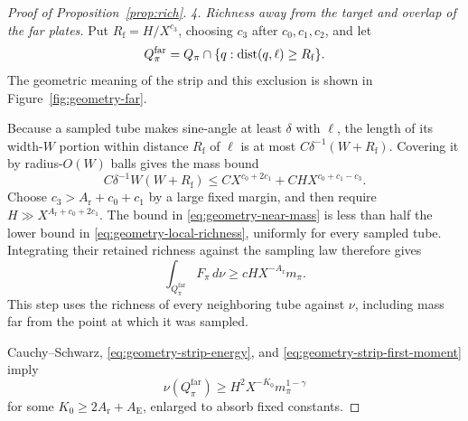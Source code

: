 \begin{proof}[Proof of Proposition~\ref{prop:rich}]
\emph{4. Richness away from the target and overlap of the far plates.}
Put $R_{\mathrm f}=H/X^{c_3}$, choosing $c_3$ after $c_0,c_1,c_2$,
and let
\[
 Q_\pi^{\mathrm{far}}
   =Q_\pi\cap\{q:\operatorname{dist}(q,\ell)\geq R_{\mathrm f}\}.
\]
The geometric meaning of the strip and this exclusion is shown in
Figure~\ref{fig:geometry-far}.

Because a sampled tube makes sine-angle at least $\delta$ with
$\ell$, the length of its width-$W$ portion within distance
$R_{\mathrm f}$ of $\ell$ is at most
$C\delta^{-1}(W+R_{\mathrm f})$. Covering it by radius-$O(W)$
balls gives the mass bound
\begin{equation}\label{eq:geometry-near-mass}
 C\delta^{-1}W(W+R_{\mathrm f})
 \leq C X^{c_0+2c_1}
       +CHX^{c_0+c_1-c_3}.
\end{equation}
Choose $c_3>A_{\mathrm r}+c_0+c_1$ by a large fixed margin, and
then require $H\gg X^{A_{\mathrm r}+c_0+2c_1}$. The bound in
\eqref{eq:geometry-near-mass} is less than half the lower bound in
\eqref{eq:geometry-local-richness}, uniformly for every sampled
tube. Integrating their retained richness against the sampling
law therefore gives
\begin{equation}\label{eq:geometry-strip-first-moment}
 \int_{Q_\pi^{\mathrm{far}}}F_\pi\,d\nu
 \geq cHX^{-A_{\mathrm r}}m_\pi.
\end{equation}
This step uses the richness of every neighboring tube against
$\nu$, including mass far from the point at which it was sampled.

Cauchy--Schwarz, \eqref{eq:geometry-strip-energy}, and
\eqref{eq:geometry-strip-first-moment} imply
\begin{equation}\label{eq:geometry-far-plate-mass}
 \nu(Q_\pi^{\mathrm{far}})
 \geq H^2X^{-K_0}m_\pi^{1-\gamma}
\end{equation}
for some $K_0\geq2A_{\mathrm r}+A_{\mathrm E}$, enlarged to absorb
fixed constants.


\end{proof}
